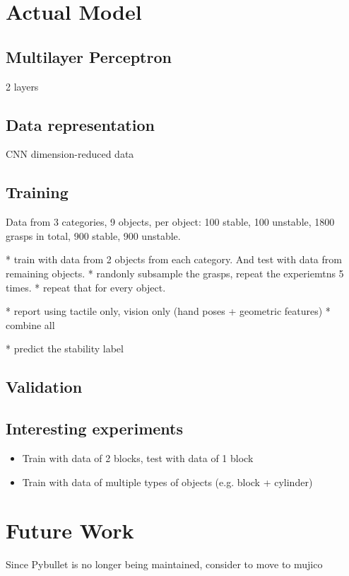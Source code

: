 \documentclass[12pt, a4paper]{report}
\theoremstyle{definition}
\begin{document}
\chapter{Actual Model}
\label{chap:5}

\section{Multilayer Perceptron}
2 layers

\section{Data representation}
CNN dimension-reduced data

\section{Training}
Data from 3 categories, 9 objects, per object: 100 stable, 100 unstable, 1800 grasps in total, 900 stable, 900 unstable.

* train with data from 2 objects from each category. And test with data from remaining objects. 
* randonly subsample the grasps, repeat the experiemtns 5 times.
* repeat that for every object. 

* report using tactile only, vision only (hand poses + geometric features)
* combine all

* predict the stability label

\section{Validation}

\section{Interesting experiments}
\begin{itemize}
    \item Train with data of 2 blocks, test with data of 1 block
    \item Train with data of multiple types of objects (e.g. block + cylinder)
\end{itemize}



\chapter{Future Work}
\label{chap:6}
Since Pybullet is no longer being maintained, consider to move to mujico
\end{document}
